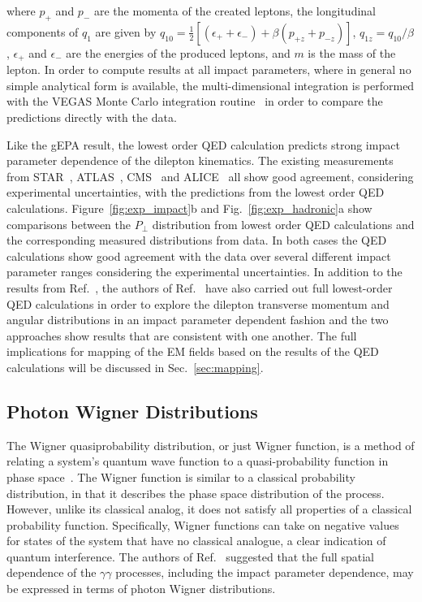 \documentclass[12pt,epjc3]{svjour3}\sloppy
\begin{document}
where $p_{+}$ and $p_{-}$ are the momenta of the created leptons, the longitudinal components of $q_{1}$ are given by $q_{10} = \frac{1}{2}[(\epsilon_{+} + \epsilon_{-}) + \beta(p_{+z}+p_{-z})]$, $q_{1z} = q_{10}/ \beta$, $\epsilon_{+}$ and $\epsilon_{-}$ are the energies of the produced leptons, and $m$ is the mass of the lepton. In order to compute results at all impact parameters, where in general no simple analytical form is available, the multi-dimensional integration is performed with the VEGAS Monte Carlo integration routine~\cite{peterlepageNewAlgorithmAdaptive1978} in order to compare the predictions directly with the data. 

Like the gEPA result, the lowest order QED calculation predicts strong impact parameter dependence of the dilepton kinematics. The existing measurements from STAR~\cite{starcollaborationLowEnsuremathPair2018b,starcollaborationMeasurementMomentumAngular2021}, ATLAS~\cite{atlascollaborationExclusiveDimuonProduction2020,atlascollaborationObservationCentralityDependentAcoplanarity2018a}, CMS~\cite{cmscollaborationObservationForwardNeutron2020a} and ALICE~\cite{lehnerDielectronProductionLow2019a} all show good agreement, considering experimental uncertainties, with the predictions from the lowest order QED calculations. 
Figure~\ref{fig:exp_impact}b and Fig.~\ref{fig:exp_hadronic}a show comparisons between the $P_\perp$ distribution from lowest order QED calculations and the corresponding measured distributions from data. In both cases the QED calculations show good agreement with the data over several different impact parameter ranges considering the experimental uncertainties.
In addition to the results from Ref.~\cite{zhaInitialTransversemomentumBroadening2020b,brandenburgAcoplanarityQEDPairs2020b}, the authors of Ref.~\cite{liImpactParameterDependence2020} have also carried out full lowest-order QED calculations in order to explore the dilepton transverse momentum and angular distributions in an impact parameter dependent fashion and the two approaches show results that are consistent with one another.
The full implications for mapping of the EM fields based on the results of the QED calculations will be discussed in Sec.~\ref{sec:mapping}.

\subsection{Photon Wigner Distributions}
The Wigner quasiprobability distribution, or just Wigner function, is a method of relating a system's quantum wave function to a quasi-probability function in phase space~\cite{caseWignerFunctionsWeyl2008}. The Wigner function is similar to a classical probability distribution, in that it describes the phase space distribution of the process. However, unlike its classical analog, it does not satisfy all properties of a classical probability function. Specifically, Wigner functions can take on negative values for states of the system that have no classical analogue, a clear indication of quantum interference. The authors of Ref.~\cite{liImpactParameterDependence2020} suggested that the full spatial dependence of the $\gamma\gamma$ processes, including the impact parameter dependence, may be expressed in terms of photon Wigner distributions. 
\end{document}
